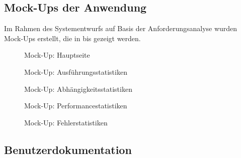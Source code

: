 \subsection{Mock-Ups der Anwendung}
\label{app:Mockup}
Im Rahmen des Systementwurfs auf Basis der Anforderungsanalyse wurden Mock-Ups erstellt, die in  bis  gezeigt werden.
\begin{figure}[htb]
    \centering
    \caption{Mock-Up: Hauptseite}
    \label{fig:Hauptseite}
\end{figure}
\begin{figure}[htb]
    \centering
    \caption{Mock-Up: Ausführungsstatistiken}
\end{figure}
\begin{figure}[htb]
    \centering
    \caption{Mock-Up: Abhängigkeitsstatistiken}
\end{figure}
\begin{figure}[htb]
    \centering
    \caption{Mock-Up: Performancestatistiken}
\end{figure}
\begin{figure}[htb]
    \centering
    \caption{Mock-Up: Fehlerstatistiken}
    \label{fig:Fehlerstatistiken}
\end{figure}

\clearpage

\subsection{Benutzerdokumentation}
\label{app:Benutzerdokumentation}
